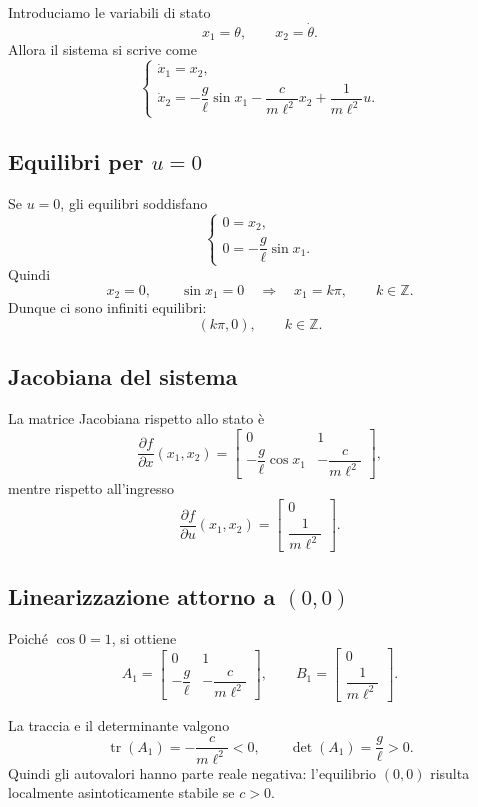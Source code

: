Introduciamo le variabili di stato
\[
x_1=\theta,
\qquad
x_2=\dot\theta.
\]
Allora il sistema si scrive come
\[
\begin{cases}
\dot x_1 = x_2,\\
\dot x_2 = -\dfrac{g}{\ell}\sin x_1 - \dfrac{c}{m\ell^2}x_2 + \dfrac{1}{m\ell^2}u.
\end{cases}
\]

\subsection{Equilibri per \(u=0\)}
Se \(u=0\), gli equilibri soddisfano
\[
\begin{cases}
0=x_2,\\
0=-\dfrac{g}{\ell}\sin x_1.
\end{cases}
\]
Quindi
\[
x_2=0,
\qquad
\sin x_1=0
\quad\Longrightarrow\quad
x_1=k\pi,\qquad k\in\mathbb{Z}.
\]
Dunque ci sono infiniti equilibri:
\[
(k\pi,0), \qquad k\in\mathbb{Z}.
\]

\subsection{Jacobiana del sistema}
La matrice Jacobiana rispetto allo stato è
\[
\frac{\partial f}{\partial x}(x_1,x_2)=
\begin{bmatrix}
0 & 1\\[0.1cm]
-\dfrac{g}{\ell}\cos x_1 & -\dfrac{c}{m\ell^2}
\end{bmatrix},
\]
mentre rispetto all'ingresso
\[
\frac{\partial f}{\partial u}(x_1,x_2)=
\begin{bmatrix}
0\\[0.1cm]
\dfrac{1}{m\ell^2}
\end{bmatrix}.
\]

\subsection{Linearizzazione attorno a \((0,0)\)}
Poiché \(\cos 0=1\), si ottiene
\[
A_1=
\begin{bmatrix}
0 & 1\\[0.1cm]
-\dfrac{g}{\ell} & -\dfrac{c}{m\ell^2}
\end{bmatrix},
\qquad
B_1=
\begin{bmatrix}
0\\[0.1cm]
\dfrac{1}{m\ell^2}
\end{bmatrix}.
\]

La traccia e il determinante valgono
\[
\operatorname{tr}(A_1)=-\frac{c}{m\ell^2}<0,
\qquad
\det(A_1)=\frac{g}{\ell}>0.
\]
Quindi gli autovalori hanno parte reale negativa: l'equilibrio \((0,0)\) risulta localmente asintoticamente stabile se \(c>0\).

